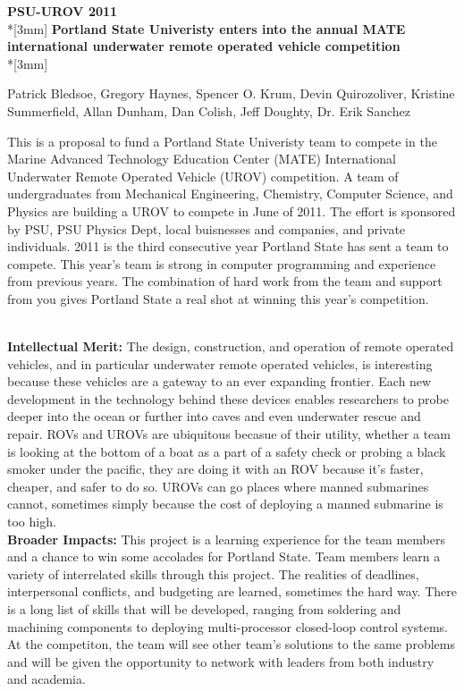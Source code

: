 \documentclass{proposalnsf}
\begin{document}
\begin{center}
{\Large{\bf PSU-UROV 2011}}\\*[3mm]
{\bf Portland State Univeristy enters into the annual MATE international underwater remote operated vehicle competition} \\*[3mm]

Patrick Bledsoe, Gregory Haynes, Spencer O. Krum, Devin Quirozoliver, Kristine Summerfield,
 Allan Dunham, Dan Colish, Jeff Doughty, Dr. Erik Sanchez

\end{center}


This is a  proposal to fund a Portland State Univeristy team to compete in the Marine Advanced Technology Education Center (MATE)
 International Underwater Remote Operated Vehicle (UROV) competition. A team of undergraduates from Mechanical Engineering,
 Chemistry, Computer Science, and Physics are building a UROV to compete in June of 2011. The effort is sponsored by PSU, 
PSU Physics Dept, local buisnesses and companies, and private individuals. 2011 is the third consecutive year Portland State has sent 
a team to compete.  This year's team is strong in computer programming and experience from previous years. The combination of hard work 
from the team and support from you gives Portland State a real shot at winning this year's competition.  



\ \\
\noindent
{\bf Intellectual Merit:}
The design, construction, and operation of remote operated vehicles, and in particular underwater remote operated vehicles, is interesting
because these vehicles are a gateway to an ever expanding frontier. Each new development in the technology behind these devices enables 
researchers to probe deeper into the ocean or further into caves and even underwater rescue and repair. ROVs and UROVs are ubiquitous becasue 
of their utility, whether a team is looking at the bottom of a boat as a part of a safety check or probing a black smoker under the pacific, 
they are doing it with an ROV because it's faster, cheaper, and safer to do so. UROVs can go places where manned submarines cannot, sometimes 
simply because the cost of deploying a manned submarine is too high.  
\ \\

\noindent
{\bf Broader Impacts:}
This project is a learning experience for the team members and a chance to win some accolades for Portland State. Team members learn 
a variety of interrelated skills through this project. The realities of deadlines, interpersonal conflicts, and budgeting are learned, 
sometimes the hard way. There is a long list of skills that will be developed, ranging from soldering and machining components to deploying 
multi-processor closed-loop control systems. At the competiton, the team will see other team's solutions to the same problems and will be
 given the opportunity to network with leaders from both industry and academia. 
\end{document}
